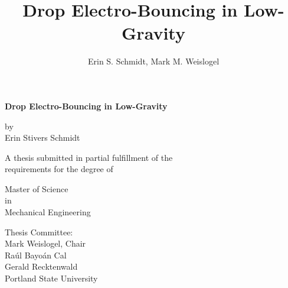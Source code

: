 \documentclass[12pt,a4paper,oneside]{book}
\title{\textsf{\textbf{Drop Electro-Bouncing in Low-Gravity}}}
\author{Erin S. Schmidt, Mark M. Weislogel}
\date{}
\newcommand\blankpage{%
    \null
    \thispagestyle{empty}%
    \addtocounter{page}{-1}%
    \newpage}
\begin{document}
\newcommand{\redline}{\raisebox{2pt}{\tikz{\draw[-,red,solid,line width = 1.5pt](0,0) -- (5mm,0);}}}
\begin{titlepage}
\doublespacing

\centering %
{\large \textsf{\textbf{Drop Electro-Bouncing in Low-Gravity}}}

\vspace{15ex}
by\\
Erin Stivers Schmidt

\vspace{15ex}
\singlespacing
A thesis submitted in partial fulfillment of the\\
requirements for the degree of

\vspace{11ex}
Master of Science\\
in\\
Mechanical Engineering

\vspace{12ex}
Thesis Committee:\\
Mark Weislogel, Chair\\
Ra\'ul Bayo\'an Cal\\
Gerald Recktenwald\\


\vfill
\vspace{2ex}
Portland State University\\%
{\number\year}
\end{titlepage}


\clearpage

\frontmatter
\end{document}
